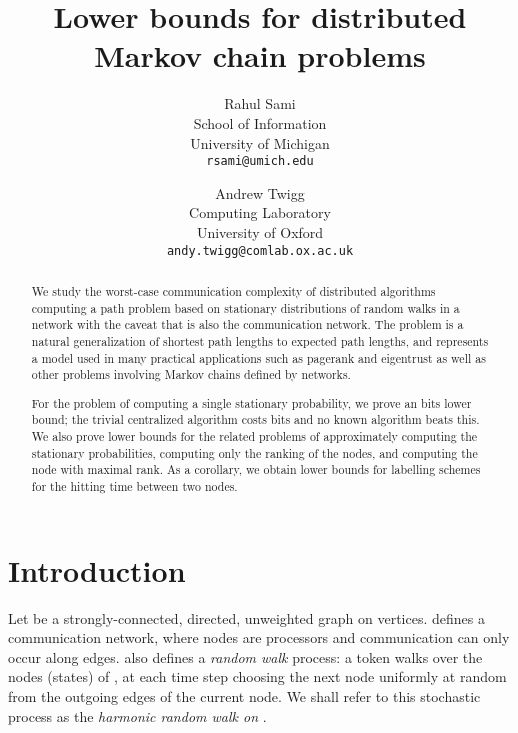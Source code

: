 \documentclass[twocolumn]{article}
\begin{document}
\title{Lower bounds for distributed \\ Markov chain problems}
\author{Rahul Sami \\ School of Information \\ University of Michigan
  \\ \texttt{rsami@umich.edu} \and Andrew Twigg \\ Computing Laboratory
  \\ University of Oxford \\ \texttt{andy.twigg@comlab.ox.ac.uk}
}
\maketitle

\begin{abstract}
We study the worst-case communication complexity of distributed algorithms computing a path problem based on stationary distributions of random walks in a network  with the caveat that  is also the communication network. The problem is a natural generalization of shortest path lengths to expected path lengths, and represents a model used in many practical applications such as pagerank and eigentrust as well as other problems involving Markov chains defined by networks.

For the problem of computing a single stationary probability, we prove an  bits lower bound; the trivial centralized algorithm
costs  bits and no known algorithm beats this. We also prove lower bounds for the related problems of approximately computing the stationary probabilities, computing only the ranking of the nodes, and computing the node with maximal rank. As a corollary, we obtain lower bounds for labelling schemes for the hitting time between two nodes.
\end{abstract}

\section{Introduction}
\label{section:introduction}

Let  be a strongly-connected, directed, unweighted graph on  vertices.  defines a communication network, where nodes are processors and communication can only occur along edges.  also defines a {\em random walk} process: a token walks over the nodes (states) of , at each time step choosing the next node uniformly at random from the outgoing edges of the current node. We shall refer to this stochastic process as the {\em harmonic random walk on }.
\end{document}
